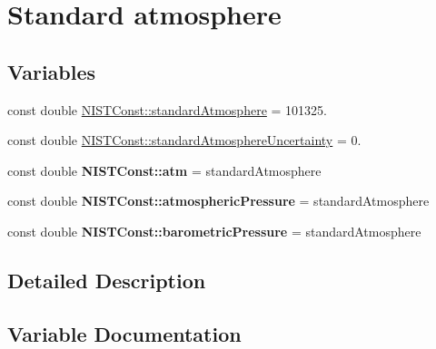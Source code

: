 \hypertarget{group___standard_atmosphere}{}\section{Standard atmosphere}
\label{group___standard_atmosphere}
\subsection*{Variables}
\begin{DoxyCompactItemize}
\item 
const double \hyperlink{group___standard_atmosphere_ga260e00232ff2d0d8a24bdbf7f6c87b4e}{N\+I\+S\+T\+Const\+::standard\+Atmosphere} = 101325.
\item 
const double \hyperlink{group___standard_atmosphere_ga784dc63051d7f1dca50f4f2843c8fbcf}{N\+I\+S\+T\+Const\+::standard\+Atmosphere\+Uncertainty} = 0.
\item 
\mbox{\label{group___standard_atmosphere_ga93a81873c4680c07e0a212604ce6e106}} 
const double {\bfseries N\+I\+S\+T\+Const\+::atm} = standard\+Atmosphere
\item 
\mbox{\label{group___standard_atmosphere_gab92a3a9d0d82fc926390602e825afea5}} 
const double {\bfseries N\+I\+S\+T\+Const\+::atmospheric\+Pressure} = standard\+Atmosphere
\item 
\mbox{\label{group___standard_atmosphere_ga09e2a2bce1e1f38985f98c22d5a8d43d}} 
const double {\bfseries N\+I\+S\+T\+Const\+::barometric\+Pressure} = standard\+Atmosphere
\end{DoxyCompactItemize}


\subsection{Detailed Description}


\subsection{Variable Documentation}
\mbox{\label{group___standard_atmosphere_ga260e00232ff2d0d8a24bdbf7f6c87b4e}} 
